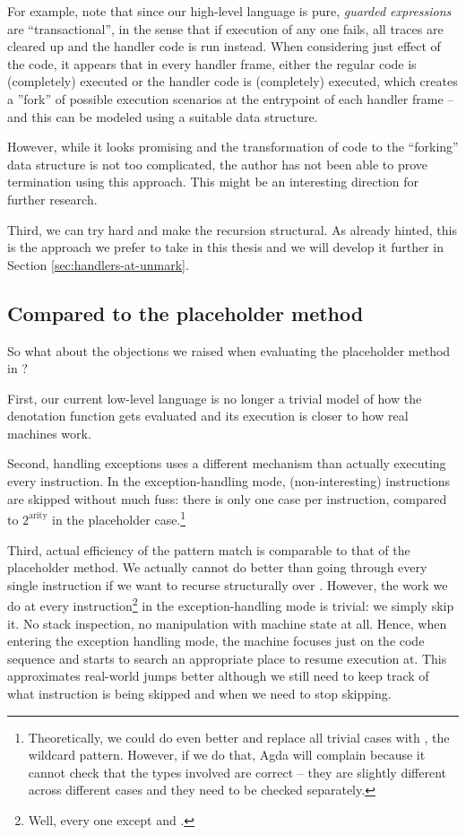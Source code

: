 For example, note that since our high-level language is pure,
\emph{guarded expressions} are
``transactional'', in the sense that if execution of any one fails, all traces
are cleared up and the handler code is run instead. When considering just
effect of the code, it appears that in every handler frame, either the regular
code is (completely) executed or the handler code is (completely) executed,
which creates a ''fork'' of possible execution scenarios at the entrypoint of
each handler frame -- and this can be modeled using a suitable data structure.

However, while it looks promising and the transformation of code to the
``forking'' data structure is not too complicated, the author has not been able
to prove termination using this approach. This might be an interesting direction
for further research.

Third, we can try hard and make the recursion structural. As already hinted,
this is the approach we prefer to take in this thesis and we will develop it
further in Section \ref{sec:handlers-at-unmark}.

\subsection{Compared to the placeholder method}

So what about the objections we raised when evaluating the placeholder method
in ?

First, our current low-level language is no longer a trivial model of how the
denotation function  gets evaluated and its execution is closer
to how real machines work.

Second, handling exceptions uses a different mechanism than actually executing
every instruction. In the exception-handling mode, (non-interesting)
instructions are skipped without much fuss: there is only one case per
instruction, compared to $2^\mathrm{arity}$ in the placeholder
case.\footnote{Theoretically, we could do even better and replace all trivial
cases with \ident{\_}, the wildcard pattern. However, if we do that, Agda will
complain because it cannot check that the types involved are correct
-- they are slightly different across different cases and they need to be
checked separately.}

Third, actual efficiency of the pattern match is comparable to that of the
placeholder method. We actually cannot do better than going through every
single instruction if we want to recurse structurally over .
However, the work we do at every instruction\footnote{Well, every one
except  and .} in the exception-handling mode is
trivial: we simply skip it. No stack inspection, no manipulation with machine
state at all.  Hence, when entering the exception handling mode, the machine
focuses just on the code sequence and starts to search an appropriate place to
resume execution at. This approximates real-world jumps better although we still
need to keep track of what instruction is being skipped and when we need to
stop skipping.


